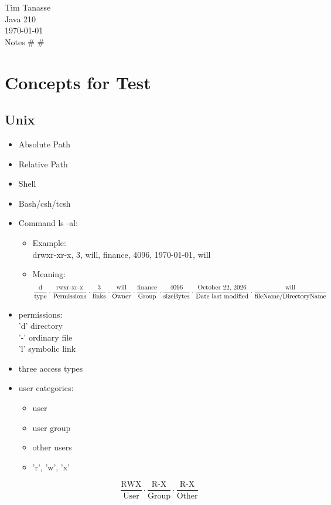 \documentclass{article}
\begin{document}
\begin{flushright}
  Tim Tanasse\\
  Java 210\\
  \today \\
  Notes \# \# \\
\end{flushright}
\section*{Concepts for Test}
\subsection*{Unix}
\begin{itemize}
  \item Absolute Path
  \item Relative Path
  \item Shell
  \item Bash/csh/tcsh
  \item Command ls -al:
  \begin{itemize}
    \item Example:\\
    drwxr-xr-x, 3, will, finance, 4096, \today, will
    \item Meaning:\\
    \[\frac{\text{d}}{\text{type}}\cdot\frac{\text{rwxr-xr-x}}{\text{Permissions}}\cdot\frac{3}{\text{links}}\cdot\frac{\text{will}}{\text{Owner}}\cdot\frac{\text{finance}}{\text{Group}}\cdot\frac{\text{4096}}{\text{sizeBytes}}\cdot\frac{\text{\today}}{\text{Date last modified}}\cdot\frac{\text{will}}{\text{fileName/DirectoryName}}\]
  \end{itemize}
  \item permissions:\\
  'd' directory\\
  '-' ordinary file\\
  'l' symbolic link
  \item three access types
  \item user categories:
  \begin{itemize}
    \item user
    \item user group
    \item other users
    \item 'r', 'w', 'x'
  \end{itemize}
  \[\frac{\text{RWX}}{\text{User}}\cdot\frac{\text{R-X}}{\text{Group}}\cdot\frac{\text{R-X}}{\text{Other}}\]

\end{itemize}
\end{document}
